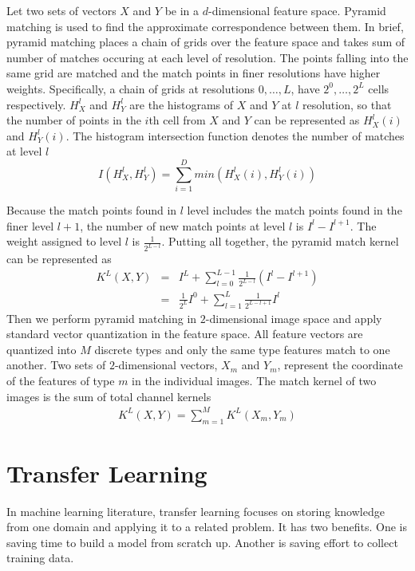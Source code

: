 Let two sets of vectors $X$ and $Y$ be in a $d$-dimensional feature space. Pyramid matching is used to find the approximate correspondence between them. In brief, pyramid matching places a chain of grids over the feature space and takes sum of number of matches occuring at each level of resolution. The points falling into the same grid are matched and the match points in finer resolutions have higher weights. Specifically, a chain of grids at resolutions $0,\dotso,L$, have $2^0,\dotso,2^L$ cells respectively. $H_{X}^l$ and $H_{Y}^l$ are the histograms of $X$ and $Y$ at $l$ resolution, so that the number of points in the $i$th cell from $X$ and $Y$ can be represented as $H_{X}^l(i)$ and $H_{Y}^l(i)$. The histogram intersection function denotes the number of matches at level $l$
\begin{equation}\label{eq:HistInterFunc}
I(H_{X}^l, H_{Y}^l) = \sum_{i=1}^D min(H_{X}^l(i), H_{Y}^l(i))
\end{equation}

Because the match points found in $l$ level includes the match points found in the finer level $l+1$, the number of new match points at level $l$ is $I^l - I^{l+1}$. The weight assigned to level $l$ is $\frac{1}{2^{L-l}}$. Putting all together, the pyramid match kernel can be represented as
\begin{eqnarray}\label{eq:PyramidChanMatchKernel}
  K^L(X,Y) & = & I^L + \sum_{l=0}^{L-1} \frac{1}{2^{L-l}}(I^l-I^{l+1})\\
 & = & \frac{1}{2^L}I^0 + \sum_{l=1}^{L}\frac{1}{2^{L-l+1}}I^l
\end{eqnarray}
Then we perform pyramid matching in $2$-dimensional image space and apply standard vector quantization in the feature space. All feature vectors are quantized into $M$ discrete types and only the same type features match to one another. Two sets of $2$-dimensional vectors, $X_m$ and $Y_m$, represent the coordinate of the features of type $m$ in the individual images. The match kernel of two images is the sum of total channel kernels
\begin{eqnarray}\label{eq:PyramidMatchKernel}
  K^L(X,Y) = \sum_{m=1}^{M} K^L(X_m, Y_m)
\end{eqnarray}

\section{Transfer Learning}

In machine learning literature, transfer learning\citep{pan2010survey} focuses on storing knowledge from one domain and applying it to a related problem. It has two benefits. One is saving time to build a model from scratch up. Another is saving effort to collect training data.

